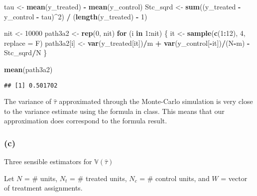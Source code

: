 \documentclass[]{article}
\newenvironment{Shaded}{\begin{snugshade}}{\end{snugshade}}
\newcommand{\ControlFlowTok}[1]{\textcolor[rgb]{0.13,0.29,0.53}{\textbf{#1}}}
\newcommand{\DataTypeTok}[1]{\textcolor[rgb]{0.13,0.29,0.53}{#1}}
\newcommand{\DecValTok}[1]{\textcolor[rgb]{0.00,0.00,0.81}{#1}}
\newcommand{\KeywordTok}[1]{\textcolor[rgb]{0.13,0.29,0.53}{\textbf{#1}}}
\newcommand{\NormalTok}[1]{#1}
\newcommand{\OperatorTok}[1]{\textcolor[rgb]{0.81,0.36,0.00}{\textbf{#1}}}
\newcommand{\StringTok}[1]{\textcolor[rgb]{0.31,0.60,0.02}{#1}}
\begin{document}
\begin{Shaded}
\begin{Highlighting}[]
\NormalTok{tau <-}\StringTok{ }\KeywordTok{mean}\NormalTok{(y_treated) }\OperatorTok{-}\StringTok{ }\KeywordTok{mean}\NormalTok{(y_control)}
\NormalTok{Stc_sqrd <-}\StringTok{ }\KeywordTok{sum}\NormalTok{((y_treated }\OperatorTok{-}\StringTok{ }\NormalTok{y_control }\OperatorTok{-}\StringTok{ }\NormalTok{tau)}\OperatorTok{^}\DecValTok{2}\NormalTok{) }\OperatorTok{/}\StringTok{ }\NormalTok{(}\KeywordTok{length}\NormalTok{(y_treated) }\OperatorTok{-}\StringTok{ }\DecValTok{1}\NormalTok{)}

\NormalTok{nit <-}\StringTok{ }\DecValTok{10000}
\NormalTok{path3a2 <-}\StringTok{ }\KeywordTok{rep}\NormalTok{(}\DecValTok{0}\NormalTok{, nit)}
\ControlFlowTok{for}\NormalTok{ (i }\ControlFlowTok{in} \DecValTok{1}\OperatorTok{:}\NormalTok{nit) \{}
\NormalTok{  it <-}\StringTok{ }\KeywordTok{sample}\NormalTok{(}\KeywordTok{c}\NormalTok{(}\DecValTok{1}\OperatorTok{:}\DecValTok{12}\NormalTok{), }\DecValTok{4}\NormalTok{, }\DataTypeTok{replace =}\NormalTok{ F)}
\NormalTok{  path3a2[i] <-}\StringTok{ }\KeywordTok{var}\NormalTok{(y_treated[it])}\OperatorTok{/}\NormalTok{m }\OperatorTok{+}\StringTok{ }\KeywordTok{var}\NormalTok{(y_control[}\OperatorTok{-}\NormalTok{it])}\OperatorTok{/}\NormalTok{(N}\OperatorTok{-}\NormalTok{m) }\OperatorTok{-}\StringTok{ }\NormalTok{Stc_sqrd}\OperatorTok{/}\NormalTok{N}
\NormalTok{\}}

\KeywordTok{mean}\NormalTok{(path3a2)}
\end{Highlighting}
\end{Shaded}

\begin{verbatim}
## [1] 0.501702
\end{verbatim}

The variance of \(\hat{\tau}\) approximated through the Monte-Carlo
simulation is very close to the variance estimate using the formula in
class. This means that our approximation does correspond to the formula
result.

\hypertarget{c}{%
\subsubsection{(c)}\label{c}}

Three sensible estimators for \(\mathbb{V}(\hat{\tau})\)

Let \(N\) = \# units, \(N_t\) = \# treated units, \(N_c\) = \# control
units, and \(W\) = vector of treatment assignments.
\end{document}
